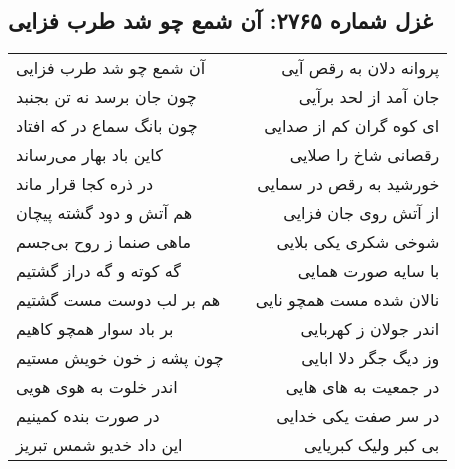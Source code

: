 \begin{center}
\section*{غزل شماره ۲۷۶۵: آن شمع چو شد طرب فزایی}
\label{sec:2765}
\begin{longtable}{l p{0.5cm} r}
آن شمع چو شد طرب فزایی
&&
پروانه دلان به رقص آیی
\\
چون جان برسد نه تن بجنبد
&&
جان آمد از لحد برآیی
\\
چون بانگ سماع در که افتاد
&&
ای کوه گران کم از صدایی
\\
کاین باد بهار می‌رساند
&&
رقصانی شاخ را صلایی
\\
در ذره کجا قرار ماند
&&
خورشید به رقص در سمایی
\\
هم آتش و دود گشته پیچان
&&
از آتش روی جان فزایی
\\
ماهی صنما ز روح بی‌جسم
&&
شوخی شکری یکی بلایی
\\
گه کوته و گه دراز گشتیم
&&
با سایه صورت همایی
\\
هم بر لب دوست مست گشتیم
&&
نالان شده مست همچو نایی
\\
بر باد سوار همچو کاهیم
&&
اندر جولان ز کهربایی
\\
چون پشه ز خون خویش مستیم
&&
وز دیگ جگر دلا ابایی
\\
اندر خلوت به هوی هویی
&&
در جمعیت به های هایی
\\
در صورت بنده کمینیم
&&
در سر صفت یکی خدایی
\\
این داد خدیو شمس تبریز
&&
بی کبر ولیک کبریایی
\\
\end{longtable}
\end{center}
